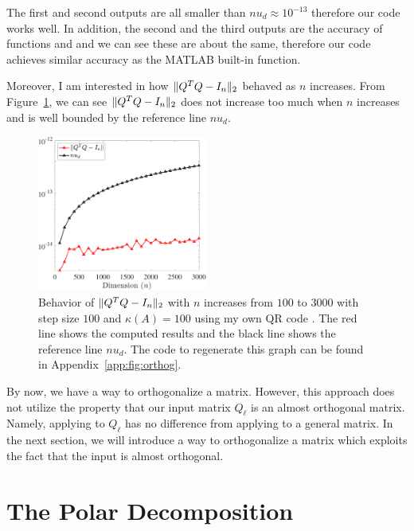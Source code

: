 The first and second outputs are all smaller than $nu_d \approx 10^{-13}$ therefore our code works well. In addition, the second and the third outputs are the accuracy of functions  and  and we can see these are about the same, therefore our code achieves similar accuracy as the MATLAB built-in function.

Moreover, I am interested in how $\norm{Q\tp Q - I_n}$ behaved as $n$ increases. From Figure~\ref{fig:orthog}, we can see $\norm{Q\tp Q - I_n}$ does not increase too much when $n$ increases and is well bounded by the reference line $nu_d$.

\begin{figure}[ht]
    \centering 
    \includegraphics[width=0.5\textwidth]{figs/myqr-numerical-test.pdf}
    \caption[Behavior of $\norm{Q\tp Q - I_n}$ with $n$ increases and $\kappa(A)$ fixes using the Householder QR factorization.]{Behavior of $\norm{Q\tp Q - I_n}$ with $n$ increases from $100$ to $3000$ with step size $100$ and $\kappa(A) = 100$ using my own QR code . The red line shows the computed results and the black line shows the reference line $nu_d$. The code to regenerate this graph can be found in Appendix~\ref{app:fig:orthog}.}
    \label{fig:orthog}
\end{figure}

By now, we have a way to orthogonalize a matrix. However, this approach does not utilize the property that our input matrix $Q_\ell$ is an almost orthogonal matrix. Namely, applying  to $Q_\ell$ has no difference from applying  to a general matrix. In the next section, we will introduce a way to orthogonalize a matrix which exploits the fact that the input is almost orthogonal.


\section{The Polar Decomposition}\label{sec:polar-decomposition}

